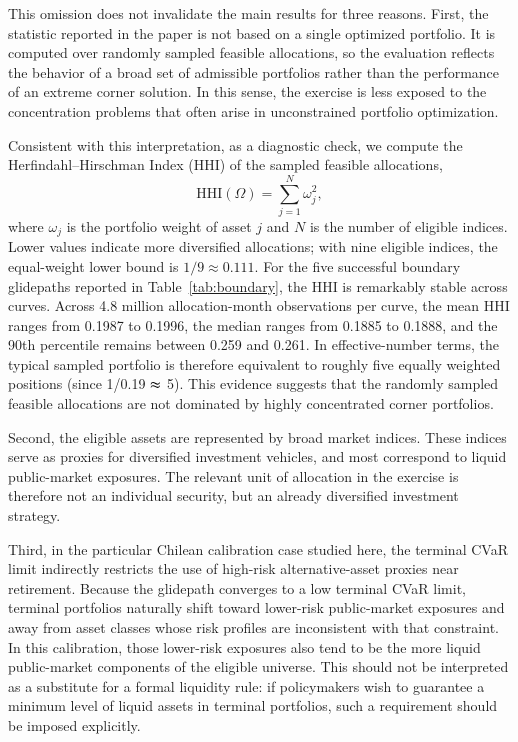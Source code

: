 \documentclass[11pt]{article}
\begin{document}
This omission does not invalidate the main results for three reasons. First, the statistic reported in the paper is not based on a single optimized portfolio. It is computed over randomly sampled feasible allocations, so the evaluation reflects the behavior of a broad set of admissible portfolios rather than the performance of an extreme corner solution. In this sense, the exercise is less exposed to the concentration problems that often arise in unconstrained portfolio optimization.

Consistent with this interpretation, as a diagnostic check, we compute the Herfindahl--Hirschman Index (HHI) of the sampled feasible allocations,
\[
\mathrm{HHI}(\Omega)=\sum_{j=1}^{N}\omega_j^2,
\]
where $\omega_j$ is the portfolio weight of asset $j$ and $N$ is the number of eligible indices. Lower values indicate more diversified allocations; with nine eligible indices, the equal-weight lower bound is $1/9 \approx 0.111$. For the five successful boundary glidepaths reported in Table~\ref{tab:boundary}, the HHI is remarkably stable across curves. Across 4.8 million allocation-month observations per curve, the mean HHI ranges from 0.1987 to 0.1996, the median ranges from 0.1885 to 0.1888, and the 90th percentile remains between 0.259 and 0.261. In effective-number terms, the typical sampled portfolio is therefore equivalent to roughly five equally weighted positions (since 1/0.19 $\thickapprox$ 5). This evidence suggests that the randomly sampled feasible allocations are not dominated by highly concentrated corner portfolios.

Second, the eligible assets are represented by broad market indices. These indices serve as proxies for diversified investment vehicles, and most correspond to liquid public-market exposures. The relevant unit of allocation in the exercise is therefore not an individual security, but an already diversified investment strategy.

Third, in the particular Chilean calibration case studied here, the terminal CVaR limit indirectly restricts the use of high-risk alternative-asset proxies near retirement. Because the glidepath converges to a low terminal CVaR limit, terminal portfolios naturally shift toward lower-risk public-market exposures and away from asset classes whose risk profiles are inconsistent with that constraint. In this calibration, those lower-risk exposures also tend to be the more liquid public-market components of the eligible universe. This should not be interpreted as a substitute for a formal liquidity rule: if policymakers wish to guarantee a minimum level of liquid assets in terminal portfolios, such a requirement should be imposed explicitly.
\end{document}
